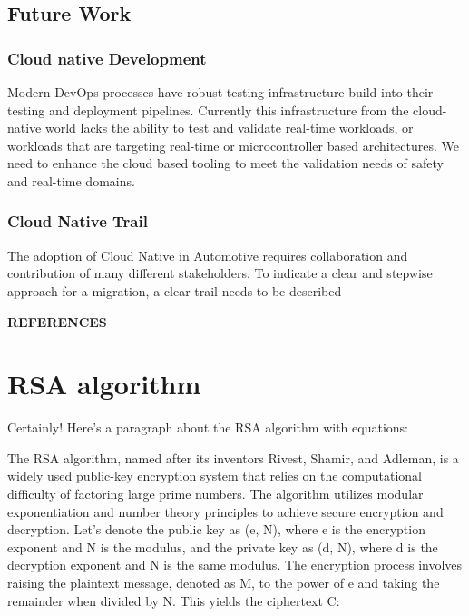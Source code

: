 \documentclass[
12pt,
oneside, 
onehalfspacing, 
nolistspacing, 
parskip, 
chapterinoneline, 
]{AASTCOMPUTER}
\begin{document}
\section{Future Work}
\subsection{Cloud native Development}
Modern DevOps processes have robust testing infrastructure build into their testing and deployment pipelines. Currently this infrastructure from the cloud-native world lacks the ability to test and validate real-time workloads, or workloads that are targeting real-time or microcontroller based architectures. We need to enhance the cloud based tooling to meet the validation needs of safety and real-time domains.
\subsection{Cloud Native Trail}
The adoption of Cloud Native in Automotive requires collaboration and contribution of many different stakeholders. To indicate a clear and stepwise approach for a migration, a clear trail needs to be described 

\newpage
{} 
{}  
\begin{center}{\Large\MakeUppercase{\textbf{References}}\par}\end{center}
\vspace{20pt}
\printbibliography[heading=none]

\appendixstart 
\chapter{RSA algorithm}
Certainly! Here's a paragraph about the RSA algorithm with equations:

The RSA algorithm, named after its inventors Rivest, Shamir, and Adleman, is a widely used public-key encryption system that relies on the computational difficulty of factoring large prime numbers. The algorithm utilizes modular exponentiation and number theory principles to achieve secure encryption and decryption. Let's denote the public key as (e, N), where e is the encryption exponent and N is the modulus, and the private key as (d, N), where d is the decryption exponent and N is the same modulus. The encryption process involves raising the plaintext message, denoted as M, to the power of e and taking the remainder when divided by N. This yields the ciphertext C:
\end{document}

